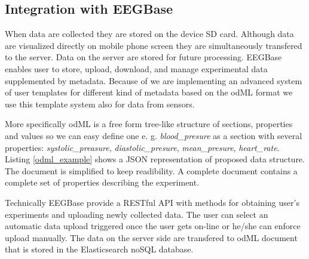 \documentclass[a4paper,twoside]{article}
\begin{document}
\subsection{Integration with EEGBase}

When data are collected they are stored on the device SD card. Although data are visualized directly on mobile phone screen they are simultaneously transfered to the server. Data on the server are stored for future processing. EEGBase enables user to store, upload, download, and manage experimental data supplemented by metadata. Because of we are implementing an advanced system of user templates for different kind of metadata based on the odML format we use this template system also for data from sensors. 

More specifically odML is  a free form tree-like structure of sections, properties and values so we can easy define one e. g. \emph{blood\_presure} as a section with several properties: \textit{systolic\_preasure}, \textit{diastolic\_presure}, \textit{mean\_presure}, \textit{heart\_rate}. Listing \ref{odml_example} shows a JSON representation of proposed data structure. The document is simplified to keep readibility. A complete document contains a complete set of properties describing the experiment.

Technically EEGBase provide a RESTful API with methods for obtaining user's experiments and uploading newly collected data. The user can select an automatic data upload triggered once the user gets on-line or he/she can enforce upload manually. The data on the server side are transfered to odML document that is stored in the Elasticsearch noSQL database.
\end{document}
